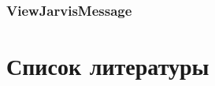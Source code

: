 \documentclass[a4paper,12pt, fleqn]{article}
\theoremstyle{plain} %
\theoremstyle{definition} %
\theoremstyle{remark} %
\numberwithin{equation}{section}
\begin{document}
\subsubsection{ViewJarvisMessage}
%
%
%
%
%

\newpage

\section{Список литературы}



\end{document}
